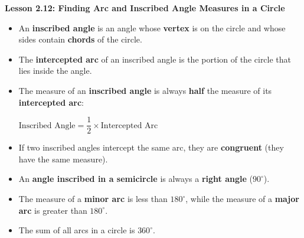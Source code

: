 \begin{center}
\textbf{Lesson 2.12: Finding Arc and Inscribed Angle Measures in a Circle}
\end{center}

\vspace*{-1.5ex}


\begin{itemize}
    \item An \textbf{inscribed angle} is an angle whose \textbf{vertex} is on the circle and whose sides contain \textbf{chords} of the circle.
    \item The \textbf{intercepted arc} of an inscribed angle is the portion of the circle that lies inside the angle.
    \item The measure of an \textbf{inscribed angle} is always \textbf{half} the measure of its \textbf{intercepted arc}:

{\centering $
    \text{Inscribed Angle} = \dfrac{1}{2} \times \text{Intercepted Arc}
$\par}
    \item If two inscribed angles intercept the same arc, they are \textbf{congruent} (they have the same measure).
    \item An \textbf{angle inscribed in a semicircle} is always a \textbf{right angle} ($90^\circ$).
    \item The measure of a \textbf{minor arc} is less than $180^\circ$, while the measure of a \textbf{major arc} is greater than $180^\circ$.
    \item The sum of all arcs in a circle is $360^\circ$.
\end{itemize}

